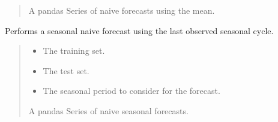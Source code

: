 \documentclass[letterpaper,10pt,english]{sphinxmanual}
\begin{document}
\begin{fulllineitems}
\begin{fulllineitems}
\begin{quote}
\begin{description}
\sphinxAtStartPar
A pandas Series of naive forecasts using the mean.

\end{description}\end{quote}

\end{fulllineitems}


\begin{fulllineitems}
\label{\detokenize{docs/model_testing:model_testing.ModelTest.naive_seasonal_forecast}}
\pysigstartsignatures
{}
\pysigstopsignatures
\sphinxAtStartPar
Performs a seasonal naive forecast using the last observed seasonal cycle.
\begin{quote}\begin{description}
\begin{itemize}
\item {} 
\sphinxAtStartPar
{} \textendash{} The training set.

\item {} 
\sphinxAtStartPar
{} \textendash{} The test set.

\item {} 
\sphinxAtStartPar
{} \textendash{} The seasonal period to consider for the forecast.

\end{itemize}

\sphinxAtStartPar
A pandas Series of naive seasonal forecasts.

\end{description}\end{quote}

\end{fulllineitems}



\end{fulllineitems}
\end{document}

